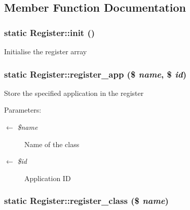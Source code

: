 \subsection{Member Function Documentation}
\hypertarget{classRegister_5c34c30e9e6ce4dea2dbb02f55e9278a}{
\subsubsection{\setlength{\rightskip}{0pt plus 5cm}static Register::init ()}}
\label{classRegister_5c34c30e9e6ce4dea2dbb02f55e9278a}


Initialise the register array \hypertarget{classRegister_c547568c4a7272fdaf65cb2825eccec3}{
\subsubsection{\setlength{\rightskip}{0pt plus 5cm}static Register::register\_\-app (\$ {\em name}, \$ {\em id})}}
\label{classRegister_c547568c4a7272fdaf65cb2825eccec3}


Store the specified application in the register

\begin{Desc}
\item[Parameters:]
\begin{description}
\item[\mbox{$\leftarrow$} {\em \$name}]Name of the class \item[\mbox{$\leftarrow$} {\em \$id}]Application ID \end{description}
\end{Desc}
\hypertarget{classRegister_58300f74d002f1306a03baf12af0f02c}{
\subsubsection{\setlength{\rightskip}{0pt plus 5cm}static Register::register\_\-class (\$ {\em name})}}
\label{classRegister_58300f74d002f1306a03baf12af0f02c}


